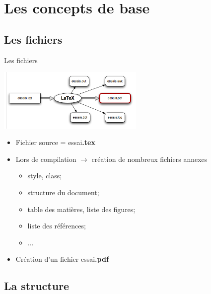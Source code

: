 \documentclass[10pt,svgnames,usenames,table]{beamer} %
\begin{document}
\section{Les concepts de base}
\subsection{Les fichiers}

\begin{frame}{Les fichiers}

	\begin{center}
		\includegraphics[height=3cm]{compilation.jpg}
	\end{center}

	\begin{itemize}
		\item Fichier source  = essai\alert{\textbf{.tex}}
		\item Lors de compilation $\rightarrow$ création de nombreux fichiers annexes
		\begin{itemize}
			\item style, class;
			\item structure du document;
			\item table des matières, liste des figures;
			\item liste des références;
			\item ...
		\end{itemize}
		\item Création d'un fichier essai\alert{\textbf{.pdf}}
	\end{itemize}
\end{frame}

\subsection{La structure}
\end{document}
